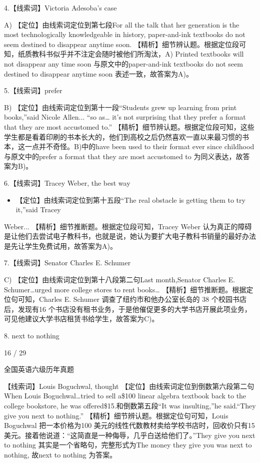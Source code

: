 \documentclass[UTF8,11pt]{ctexart}
\begin{document}
4.【线索词】Victoria Adesoba's case


A) 【定位】由线索词定位到第七段For all the talk that her generation is the most technologically knowledgeable in history, paper-and-ink textbooks do not seem destined to disappear anytime soon. 【精析】细节辨认题。根据定位段可知，纸质教科书似乎并不注定会随时被他们所淘汰，A) Printed textbooks will not disappear any time soon 与原文中的paper-and-ink textbooks do not seem destined to disappear anytime soon 表述一致，故答案为A)。


5.【线索词】prefer


B) 【定位】由线索词定位到第十一段“Students grew up learning from print books,”said Nicole Allen... “so as… it's not surprising that they prefer a format that they are most accustomed to.” 【精析】细节辨认题。根据定位段可知，这些学生都是看着印刷的书本长大的，他们到高校之后仍然喜欢一直以来最习惯的书本，这一点并不奇怪。B)中的have been used to their format ever since childhood 与原文中的prefer a format that they are most accustomed to 为同义表达，故答案为B)。


6.【线索词】Tracey Weber, the best way


\begin{itemize}[leftmargin=2em,itemsep=.2em,topsep=.4em]\item[A.] 【定位】由线索词定位到第十五段“The real obstacle is getting them to try it,”said Tracey
\end{itemize}

Weber... 【精析】细节推断题。根据定位段可知，Tracey Weber 认为真正的障碍是让他们去尝试电子教科书，也就是说，她认为要扩大电子教科书销量的最好办法是先让学生免费试用，故答案为A)。


7.【线索词】Senator Charles E. Schumer


C) 【定位】由线索词定位到第十八段第二句Last month,Senator Charles E. Schumer…urged more college stores to rent books… 【精析】细节推断题。根据定位句可知，Charles E. Schumer 调查了纽约市和他办公室长岛的 38 个校园书店后，发现有16 个书店没有租书业务，于是他催促更多的大学书店开展此项业务，可见他建议大学书店租赁书给学生，故答案为C)。


8. next to nothing


16 / 29


全国英语六级历年真题


【线索词】Louis Boguchwal, thought 【定位】由线索词定位到倒数第六段第二句When Louis Boguchwal…tried to sell a\$100 linear algebra textbook back to the college bookstore, he was offered\$15.和倒数第五段“It was insulting,”he said.“They give you next to nothing.” 【精析】细节辨认题。根据定位句可知，Louis Boguchwal 把一本价格为100 美元的线性代数教材卖给学校书店时，回收价只有15 美元。接着他说道：“这简直是一种侮辱，几乎白送给他们了。”They give you next to nothing 其实是一个省略句，完整形式为The money they give you was next to nothing, 故next to nothing 为答案。
\end{document}
